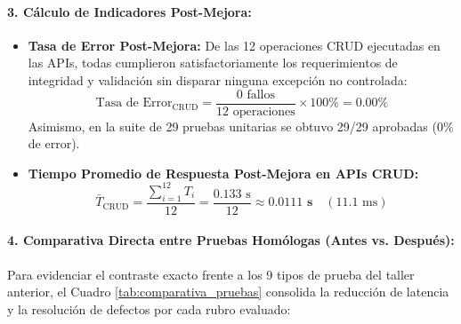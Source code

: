 \documentclass{article}
\begin{document}
\paragraph{3. Cálculo de Indicadores Post-Mejora:}
\begin{itemize}
    \item \textbf{Tasa de Error Post-Mejora:} De las 12 operaciones CRUD ejecutadas en las APIs, todas cumplieron satisfactoriamente los requerimientos de integridad y validación sin disparar ninguna excepción no controlada:
    \begin{equation}
        \text{Tasa de Error}_{\text{CRUD}} = \frac{0\text{ fallos}}{12\text{ operaciones}} \times 100\% = \mathbf{0.00\%}
    \end{equation}
    Asimismo, en la suite de 29 pruebas unitarias se obtuvo 29/29 aprobadas ($0\%$ de error).
    \item \textbf{Tiempo Promedio de Respuesta Post-Mejora en APIs CRUD:}
    \begin{equation}
        \bar{T}_{\text{CRUD}} = \frac{\sum_{i=1}^{12} T_i}{12} = \frac{0.133\text{ s}}{12} \approx \mathbf{0.0111\text{ s}} \quad (11.1\text{ ms})
    \end{equation}
\end{itemize}

\paragraph{4. Comparativa Directa entre Pruebas Homólogas (Antes vs. Después):}
Para evidenciar el contraste exacto frente a los 9 tipos de prueba del taller anterior, el Cuadro \ref{tab:comparativa_pruebas} consolida la reducción de latencia y la resolución de defectos por cada rubro evaluado:
\end{document}
